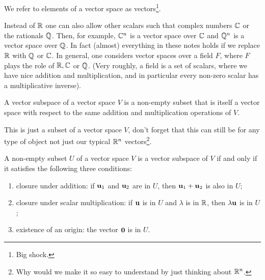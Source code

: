 \documentclass[10pt, a4paper]{article}
\begin{document}
We refer to elements of a vector space as vectors\footnote{Big shock.}.

\begin{remark}
    Instead of $\mathbb{R}$ one can also allow other scalars such that complex numbers $\mathbb{C}$ or the rationals $\mathbb{Q}$.
    Then,
    for example,
    $\mathbb{C} ^ n$ is a vector space over $\mathbb{C}$ and $\mathbb{Q} ^ n$ is a vector space over $\mathbb{Q}$.
    In fact
    (almost)
    everything in these notes holds if we replace $\mathbb{R}$ with $\mathbb{Q}$ or $\mathbb{C}$.
    In general,
    one considers vector spaces over a field $F$,
    where $F$ plays the role of $\mathbb{R}, \mathbb{C}$ or $\mathbb{Q}$.
    (Very roughly,
    a field is a set of scalars,
    where we have nice addition and multiplication,
    and in particular every non-zero scalar has a multiplicative inverse).
\end{remark}

\begin{definition}
    A vector subspace of a vector space $V$ is a non-empty subset that is itself a vector space with respect to the same addition and multiplication operations of $V$.
\end{definition}
This is just a subset of a vector space $V$,
don't forget that this can still be for any type of object not just our typical $\mathbb{R} ^ n$ vectors\footnote{Why would we make it so easy to understand by just thinking about $\mathbb{R} ^ n$.}.

\begin{proposition}
    A non-empty subset $U$ of a vector space $V$ is a vector subspace of $V$ if and only if it satisfies the following three conditions:
    \begin{enumerate}[label = (\roman*)]
        \item closure under addition:
        if $\mathbf{u}_1$ and $\mathbf{u}_2$ are in $U$,
        then $\mathbf{u}_1 + \mathbf{u}_2$ is also in $U$;
        \item closure under scalar multiplication:
        if $\mathbf{u}$ is in $U$ and $\lambda$ is in $\mathbb{R}$,
        then $\lambda\mathbf{u}$ is in $U$;
        \item existence of an origin:
        the vector $\mathbf{0}$ is in $U$.
    \end{enumerate}
\end{proposition}
\end{document}
